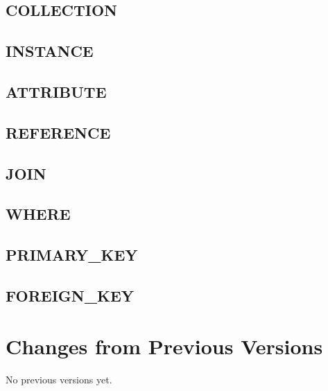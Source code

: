 \documentclass[11pt,a4paper]{ivoa}
\begin{document}
\subsection{COLLECTION}

\FloatBarrier

\subsection{INSTANCE}

\FloatBarrier

\subsection{ATTRIBUTE}

\FloatBarrier

\subsection{REFERENCE}

\FloatBarrier

\subsection{JOIN}

\FloatBarrier

\subsection{WHERE}

\FloatBarrier

\subsection{PRIMARY\_KEY}

\FloatBarrier

\subsection{FOREIGN\_KEY}

\FloatBarrier

\pagebreak
\section{Changes from Previous Versions}

No previous versions yet.  



\end{document}
